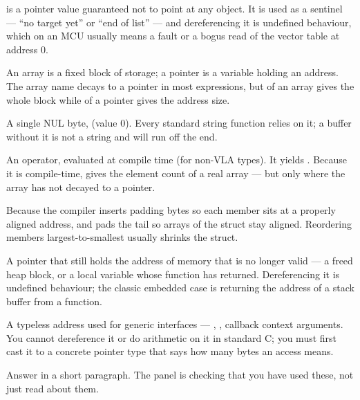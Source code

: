  is a pointer value guaranteed not to point at any object. It is
used as a sentinel --- ``no target yet'' or ``end of list'' --- and
dereferencing it is undefined behaviour, which on an MCU usually means a fault
or a bogus read of the vector table at address 0.

An array is a fixed block of storage; a pointer is a variable holding an
address. The array name decays to a pointer in most expressions, but
 of an array gives the whole block while  of a
pointer gives the address size.

A single NUL byte,  (value 0). Every standard string
function relies on it; a buffer without it is not a string and 
will run off the end.

An operator, evaluated at compile time (for non-VLA types). It yields
. Because it is compile-time,
 gives the element count of a real array ---
but only where the array has not decayed to a pointer.

Because the compiler inserts padding bytes so each member sits at a properly
aligned address, and pads the tail so arrays of the struct stay aligned.
Reordering members largest-to-smallest usually shrinks the struct.

A pointer that still holds the address of memory that is no longer valid ---
a freed heap block, or a local variable whose function has returned.
Dereferencing it is undefined behaviour; the classic embedded case is
returning the address of a stack buffer from a function.

A typeless address used for generic interfaces --- ,
, callback context arguments. You cannot dereference it or do
arithmetic on it in standard C; you must first cast it to a concrete pointer
type that says how many bytes an access means.

%
{Answer in a short paragraph. The panel is checking that you have used these,
not just read about them.}

